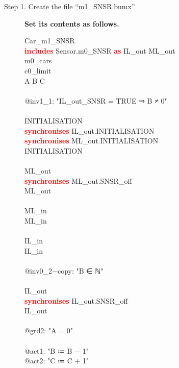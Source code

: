 \begin{description}
	\item[Step 1. Create the file ``m1\_SNSR.bumx''] \textbf{Set its contents as follows.}
	
		\begin{center}
		\begin{Bcode}
			\ifplastex
			\Bmachine{} Car_m1_SNSR\\
			\textcolor{red}{\textbf{includes}} Sensor.m0_SNSR \textcolor{red}{\textbf{as}} IL_out ML_out\\
			\Brefines{} m0_cars\\
			\Bsees{} c0_limit\\
			\Bvariables{} A B C\\
			\Binvariants\\
			@inv1_1: "IL_out_SNSR = TRUE ⇒ B ≠ 0"\\
			\Bevents\\
			INITIALISATION \Bextended\\
			\textcolor{red}{\textbf{synchronises}} IL_out.INITIALISATION\\
			\textcolor{red}{\textbf{synchronises}} ML_out.INITIALISATION\\
			\Brefines{} INITIALISATION\\
			\Bend\\
			ML_out \Bextended\\
			\textcolor{red}{\textbf{synchronises}} ML_out.SNSR_off\\
			\Brefines{} ML_out\\
			\Bend\\
			ML_in \Bextended\\
			\Brefines{} ML_in\\
			\Bend\\
			IL_in \Bextended\\
			\Brefines{} IL_in\\
			\Bwhen\\
			@inv0_2−copy: "B ∈ ℕ" \Btheorem\\
			\Bend\\
			IL_out\\
			\textcolor{red}{\textbf{synchronises}} IL_out.SNSR_off\\
			\Brefines{} IL_out\\
			\Bwhen\\
			@grd2: "A = 0"\\
			\Bthen\\
			@act1: "B ≔ B − 1"\\
			@act2: "C ≔ C + 1"\\

\end{Bcode}
\end{center}
\end{description}
